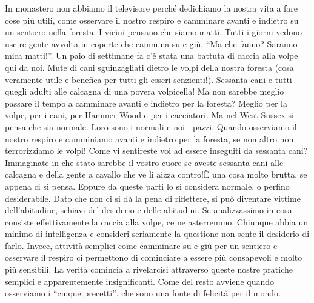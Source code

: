 In monastero non abbiamo il televisore perché dedichiamo la nostra vita
a fare cose più utili, come osservare il nostro respiro e camminare
avanti e indietro su un sentiero nella foresta. I vicini pensano che
siamo matti. Tutti i giorni vedono uscire gente avvolta in coperte che
cammina su e giù. ``Ma che fanno? Saranno mica matti!''. Un paio di
settimane fa c'è stata una battuta di caccia alla volpe qui da noi. Mute
di cani sguinzagliati dietro le volpi della nostra foresta (cosa
veramente utile e benefica per tutti gli esseri senzienti!). Sessanta
cani e tutti quegli adulti alle calcagna di una povera volpicella! Ma
non sarebbe meglio passare il tempo a camminare avanti e indietro per la
foresta? Meglio per la volpe, per i cani, per Hammer Wood e per i
cacciatori. Ma nel West Sussex si pensa che sia normale. Loro sono i
normali e noi i pazzi. Quando osserviamo il nostro respiro e camminiamo
avanti e indietro per la foresta, se non altro non terrorizziamo le
volpi! Come vi sentireste voi ad essere inseguiti da sessanta cani?
Immaginate in che stato sarebbe il vostro cuore se aveste sessanta cani
alle calcagna e della gente a cavallo che ve li aizza contro!È una
cosa molto brutta, se appena ci si pensa. Eppure da queste parti lo si
considera normale, o perfino desiderabile. Dato che non ci si dà la pena
di riflettere, si può diventare vittime dell'abitudine, schiavi del
desiderio e delle abitudini. Se analizzassimo in cosa consiste
effettivamente la caccia alla volpe, ce ne asterremmo. Chiunque abbia un
minimo di intelligenza e consideri seriamente la questione non sente il
desiderio di farlo. Invece, attività semplici come camminare su e giù
per un sentiero e osservare il respiro ci permettono di cominciare a
essere più consapevoli e molto più sensibili. La verità comincia a
rivelarcisi attraverso queste nostre pratiche semplici e apparentemente
insignificanti. Come del resto avviene quando osserviamo i ``cinque
precetti'', che sono una fonte di felicità per il mondo.

